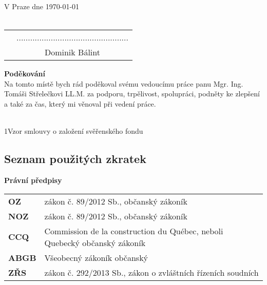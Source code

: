 \documentclass{article}
\begin{document}
\noindent V Praze dne \today\\%
\vspace{10mm} \\
\begin{tabular}{p{11.5cm}c}
& ................................................. \\
& Dominik Bálint
\end{tabular}

\newpage

\thispagestyle{empty}

\vspace*{\fill}
\noindent \textbf{Poděkování} \\

	Na tomto místě bych rád poděkoval svému vedoucímu práce panu Mgr. Ing. 
Tomáši Střelečkovi LL.M. za podporu, trpělivost, spolupráci, podněty ke zlepšení a 
také za čas, který mi věnoval při vedení práce.

\vspace*{\fill}

\newpage
  \thispagestyle{Contents}
  \tableofcontents
  
 \newpage
  \listoffigures

\vspace*{0.5cm}
  
\\

\normalsize{1\hspace*{1.8em}Vzor smlouvy o založení svěřenského fondu}

\newpage
 
\begin{center}
\section{Seznam použitých zkratek}
\end{center}

\vspace{5 mm}

\textbf{Právní předpisy}

\vspace{5 mm}

\begin{tabular}{p{3cm}p{8cm}}
\textbf{OZ} & zákon č. 89/2012 Sb., občanský zákoník	 \\
\textbf{NOZ} & zákon č. 89/2012 Sb., občanský zákoník	 \\
\textbf{CCQ} & Commission de la construction du Québec, neboli Quebecký občanský zákoník \\
\textbf{ABGB} & Všeobecný zákoník občanský	 \\
\textbf{ZŘS} & zákon č. 292/2013 Sb., zákon o zvláštních řízeních soudních	 \\
\end{tabular}
\end{document}
